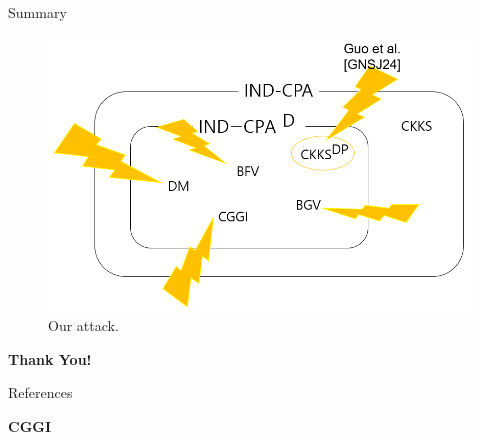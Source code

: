 \documentclass{beamer}
\begin{document}
    \begin{frame}{Summary}

        \begin{figure}[h]
            \centering
            \includegraphics[width=0.7\linewidth]{diagram 3.png}
            \caption{Our attack. }
        \end{figure}
    \end{frame}
    
    \begin{frame}{}
    \begin{center}
        {\Huge\bf Thank You!}
    \end{center}
    \end{frame}
    
    \begin{frame}{References}
    
    
    
    
    \end{frame}


    \begin{frame}{}
    \begin{center}
        {\Huge \bf CGGI}
    \end{center} 
    \end{frame}   
    
\end{document}

